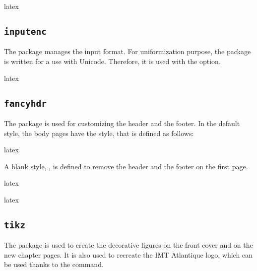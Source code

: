 \documentclass{report}
\begin{document}
\begin{imtaCode}{latex}
\RequirePackage[hidelinks]{hyperref}
\end{imtaCode}


\subsection{\texttt{inputenc}}
The  package manages the input format.
For uniformization purpose, the  package is written for a use with Unicode.
Therefore, it is used with the  option.

\begin{imtaCode}{latex}
\RequirePackage[utf8]{inputenc}
\end{imtaCode}


\subsection{\texttt{fancyhdr}}
The  package is used for customizing the header and the footer.
In the default style, the body pages have the  style, that is defined as follows:

\begin{imtaCode}{latex}
\pagestyle{fancy}
\fancyhead{}
\fancyfoot{}
\fancyhead[L]{\thetitle}
\fancyhead[R]{\imtaTheAuthorShort}
\fancyfoot[C]{\thepage}
\end{imtaCode}

A blank style, , is defined to remove the header and the footer on the first page.

\begin{imtaCode}{latex}
\end{imtaCode}


\begin{imtaCode}{latex}
\RequirePackage{fancyhdr}
\end{imtaCode}


\subsection{\texttt{tikz}}
The  package is used to create the decorative figures on the front cover and on the new chapter pages. It is also used to recreate the IMT Atlantique logo, which can be used thanks to the  command.
\end{document}
